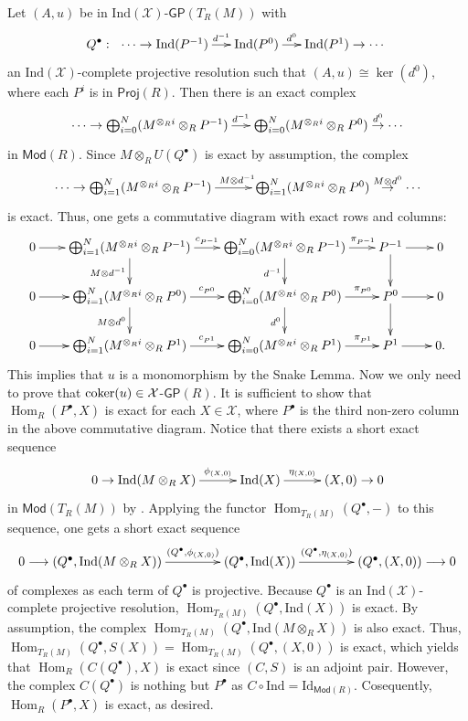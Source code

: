 \documentclass[10pt,twoside]{amsart}
\theoremstyle{bfupright head,slanted body}
\theoremstyle{bfupright head,upright body}
\theoremstyle{fixed bf head,slanted body}
\theoremstyle{fixed bf head,upright body}
\theoremstyle{numbered paragraph}
\newenvironment{prf*}[1][Proof]{%
  \begin{proof}[\bf #1]
    \setcounter{equation}{0}
    \renewcommand{\theequation}{\arabic{equation}}}
  {\end{proof}
  }
\numberwithin{equation}{res}
\newcommand{\GP}{\mathsf{GP}}
\newcommand{\Proj}{\mathsf{Proj}}
\newcommand{\Mod}{\mathsf{Mod}}
\newcommand{\Ind}{\mathrm{Ind}}
\newcommand{\Id}{\mathrm{Id}}
\newcommand{\cok}{\mbox{\rm coker}}
\newcommand{\Hom}{\operatorname{Hom}}
\newcommand{\is}{\cong}
\begin{document}
\begin{prf*}
Let $(A,u)$ be in $\Ind(\mathcal{X})$-$\GP(T_R(M))$ with
$$Q^\bullet:\ \xymatrix@C=0.5cm{
\cdots \to \Ind(P^{-1}) \ar[r]^-{d^{-1}} & \Ind(P^{0})
\ar[r]^-{d^0} & \Ind(P^{1}) \to \cdots}$$
an $\Ind(\mathcal{X})$-complete projective resolution such that $(A,u)\is\ker(d^0)$,
where each $P^i$ is in $\Proj(R)$.
Then there is an exact complex
$$\xymatrix@C=0.5cm{
\cdots \to
\bigoplus_{i=0}^N(M^{\otimes_Ri}\otimes_RP^{-1})
\ar[r]^{\,\,d^{-1}} & \bigoplus_{i=0}^N(M^{\otimes_Ri}\otimes_RP^0)
\overset{d^{0}}\to \cdots}$$
in $\Mod(R)$.
Since $M\otimes_RU(Q^\bullet)$ is exact by assumption, the complex
$$\xymatrix@C=1cm{\cdots \to \bigoplus_{i=1}^N(M^{\otimes_Ri}\otimes_RP^{-1})
\ar[r]^{\,\, M\otimes d^{-1}} &
\bigoplus_{i=1}^N(M^{\otimes_Ri}\otimes_RP^0) \overset{M\otimes d^{0}}\to \cdots}$$
is exact. Thus, one gets a commutative diagram with exact rows and columns:
$$
\xymatrix@C=0.7cm@R=0.7cm{
  0 \ar[r]^{}
  & \bigoplus_{i=1}^N(M^{\otimes_Ri}\otimes_RP^{-1}) \ar[d]_{M\otimes d^{-1}}
  \ar[r]^{c_{P^{-1}}}
  & \bigoplus_{i=0}^N(M^{\otimes_Ri}\otimes_RP^{-1})
    \ar[d]_{d^{-1}} \ar[r]^{\qquad \qquad \pi_{P^{-1}}}
  & P^{-1} \ar[d]_{} \ar[r]^{} & 0  \\
  0 \ar[r]^{}
  & \bigoplus_{i=1}^N(M^{\otimes_Ri}\otimes_RP^0) \ar[d]_{M\otimes d^0}
    \ar[r]^{c_{P^0}}
  & \bigoplus_{i=0}^N(M^{\otimes_Ri}\otimes_RP^0)
    \ar[d]_{d^0} \ar[r]^{\qquad \qquad \pi_{P^0}}
  & P^0 \ar[d]_{} \ar[r]^{} & 0  \\
  0 \ar[r]^{}
  & \bigoplus_{i=1}^N(M^{\otimes_Ri}\otimes_RP^1)
  \ar[r]^{c_{P^1}}
  & \bigoplus_{i=0}^N(M^{\otimes_Ri}\otimes_RP^1)
  \ar[r]^{\qquad \qquad \pi_{P^1}}
  & P^1 \ar[r]^{} & 0. }$$
This implies that $u$ is a monomorphism by the Snake Lemma.
Now we only need to prove that $\cok(u)\in\mathcal{X}$-$\GP(R)$.
It is sufficient to show that $\Hom_R(P^\bullet, X)$ is exact for each $X \in \mathcal{X}$,
where $P^\bullet$ is the third non-zero column in the above commutative diagram.
Notice that there exists a short exact sequence
$$\xymatrix@C=1cm{0 \to
\Ind(M\otimes_R X) \ar[r]^-{\phi_{(X,0)}} &
\Ind(X) \ar[r]^-{\eta_{(X,0)}} & (X,0) \to 0}$$
in $\Mod(T_R(M))$ by \cite[Remark 1.5]{DL}.
Applying the functor $\Hom_{T_R(M)}(Q^\bullet, -)$ to this sequence, one gets a short exact sequence
\[\xymatrix@C=1.5cm{ 0 \longrightarrow  (Q^\bullet,\Ind(M\otimes_R X))\ar[r]^-{(Q^\bullet,\phi_{(X,0)})} &
(Q^\bullet,\Ind(X))
 \ar[r]^-{(Q^\bullet,\eta_{(X,0)})} &(Q^\bullet,(X,0)) \longrightarrow 0}
\]
of complexes as each term of $Q^\bullet$ is projective.
Because $Q^\bullet$ is an $\Ind(\mathcal{X})$-complete projective resolution, $\Hom_{T_R(M)}(Q^\bullet,\Ind(X))$ is exact. By assumption, the complex $\Hom_{T_R(M)}(Q^\bullet, \Ind(M\otimes_RX))$ is also exact.
Thus, $\Hom_{T_R(M)}(Q^\bullet, S(X))=\Hom_{T_R(M)}(Q^\bullet, (X, 0))$ is exact, which yields that $\Hom_R(C(Q^\bullet), X)$ is exact since $(C, S)$ is an adjoint pair.
However, the complex $C(Q^\bullet)$ is nothing but $P^\bullet$
as $C\circ\Ind=\Id_{\Mod(R)}$.
Cosequently, $\Hom_R(P^\bullet, X)$ is exact, as desired.
\end{prf*}
\end{document}
